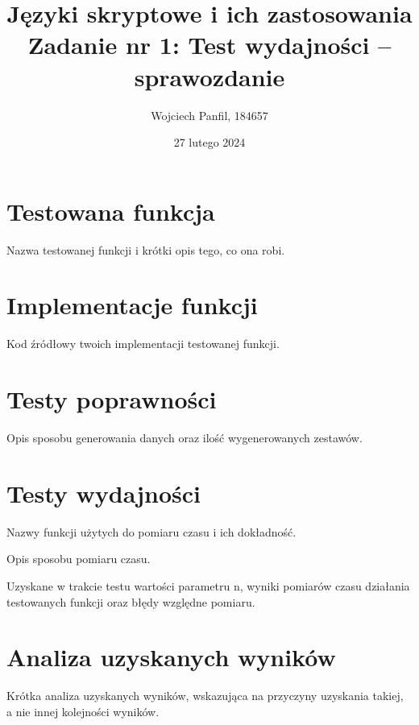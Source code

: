 \documentclass[11pt]{article}
\title{
	\textbf{Języki skryptowe i ich zastosowania}\\
	Zadanie nr 1: Test wydajności -- sprawozdanie}
\author{Wojciech Panfil, 184657}
\date{27 lutego 2024}
\begin{document}
	\maketitle
	
	\section{Testowana funkcja}
	Nazwa testowanej funkcji i krótki opis tego, co ona robi.
	
	\section{Implementacje funkcji}
	Kod źródłowy twoich implementacji testowanej funkcji.
	
	\section{Testy poprawności}
	Opis sposobu generowania danych oraz ilość wygenerowanych zestawów. 
	
	\section{Testy wydajności}
	Nazwy funkcji użytych do pomiaru czasu i ich dokładność.
	
	Opis sposobu pomiaru czasu.
	
	Uzyskane w trakcie testu wartości parametru n, wyniki pomiarów czasu działania testowanych funkcji oraz błędy względne pomiaru.
	
	\section{Analiza uzyskanych wyników}
	Krótka analiza uzyskanych wyników, wskazująca na przyczyny uzyskania takiej, a nie innej kolejności wyników.
\end{document}
